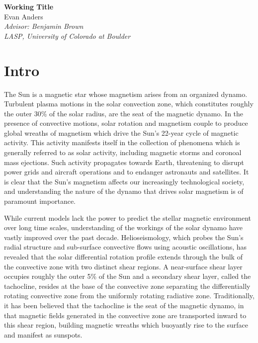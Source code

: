 \documentclass[aasms,12pt]{article}
\begin{document}
\begin{center}
   \Large\textbf{Working Title}\\
   \vspace{0.4cm}
   \large{Evan Anders}\\
   \vspace{0.4cm}
   \normalsize\textit{Advisor: Benjamin Brown}\\
   \normalsize\textit{LASP, University of Colorado at Boulder}\\
\end{center}






\section{Intro}
The Sun is a magnetic star whose magnetism arises from an organized dynamo. 
Turbulent plasma
motions in the solar convection zone, which constitutes roughly the outer 30\%
of the solar radius, are the seat of the magnetic dynamo.  In the presence of
convective motions, solar rotation and magnetism couple to produce global
wreaths of magnetism which drive the Sun's 22-year cycle of magnetic activity.
This activity manifests itself in the collection of phenomena which is generally
referred to as solar activity, including magnetic storms and coronoal mass
ejections.  Such activity propagates towards Earth, threatening to disrupt power
grids and aircraft operations and to endanger astronauts and satellites.  It is
clear that the Sun's magnetism affects our increasingly technological society,
and understanding the nature of the dynamo that drives solar magnetism is of
paramount importance.

While current models lack the power to predict the stellar magnetic environment 
over long time scales, understanding of the workings of the solar dynamo have
vastly improved over the past decade.  Helioseismology, which probes the Sun's
radial structure and sub-surface convective flows using acoustic oscillations,
has revealed that the solar differential rotation profile extends through the
bulk of the convective zone with two distinct shear regions.  A near-surface
shear layer occupies roughly the outer 5\% of the Sun and a secondary shear
layer, called the tachocline, resides at the base of the convective zone
separating the differentially rotating convective zone from the uniformly
rotating radiative zone.  Traditionally, it has been believed that the
tachocline is the seat of the magnetic dynamo, in that magnetic fields generated
in the convective zone are transported inward to this shear region, building
magnetic wreaths which buoyantly rise to the surface and manifest as sunspots.
\end{document}
